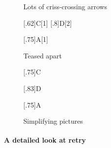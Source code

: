 \documentclass[final]{article}
\begin{document}
\begin{figure}
\begin{center}
\begin{msc}{Lots of criss-crossing arrows}
\setlength{\levelheight}{2.0\levelheight}

[.62]{C}[1]
[.8]{D}[2]

\nextlevel
{}[.75]{A}[1]

\nextlevel

\end{msc}
\end{center}

\begin{center}
\begin{msc}{Teased apart}
\setlength{\levelheight}{2.0\levelheight}

\nextlevel
{}[.75]{C}

\nextlevel
{}[.83]{D}

\nextlevel
{}[.75]{A}

\end{msc}
\end{center}
\caption{Simplifying pictures}
\label{fig:atomic-nonatomic}
\end{figure}


\paragraph{A detailed look at retry}
\end{document}
